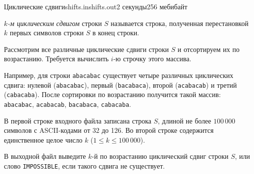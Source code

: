 \begin{problem}{Циклические сдвиги}{shifts.in}{shifts.out}{2 секунды}{256 мебибайт}

\textit{$k$-м циклическим сдвигом} строки $S$ называется
строка, полученная перестановкой $k$ первых символов строки $S$ в конец строки.

Рассмотрим все различные циклические сдвиги строки $S$ и отсортируем их по возрастанию.
Требуется вычислить $i$-ю строчку этого массива.

Например, для строки \texttt{abacabac} существует четыре различных циклических сдвига:
нулевой (\texttt{abacabac}), первый (\texttt{bacabaca}), второй (\texttt{acabacab}) и
третий (\texttt{cabacaba}). После сортировки по возрастанию получится такой массив:
\texttt{abacabac}, \texttt{acabacab}, \texttt{bacabaca}, \texttt{cabacaba}.

\InputFile

В первой строке входного файла записана строка $S$, длиной не более $100\,000$ 
символов с ASCII-кодами от 32 до 126. Во второй строке содержится единственное
целое число $k$ ($1 \le k \le 100\,000$).

\OutputFile

В выходной файл выведите $k$-й по возрастанию циклический сдвиг строки $S$, или
слово \texttt{IMPOSSIBLE}, если такого сдвига не существует.

\Example

\begin{example}
%
\end{example}

\end{problem}
